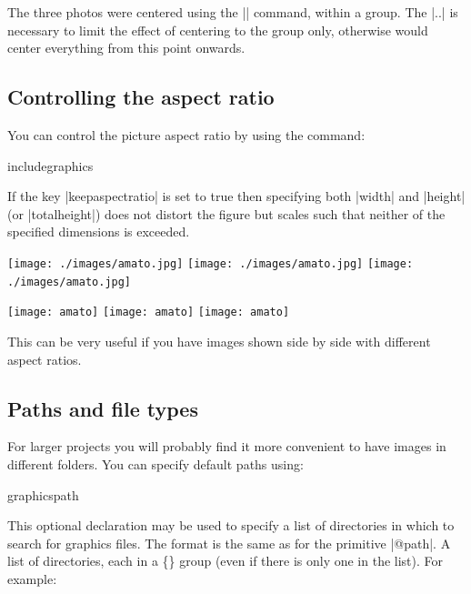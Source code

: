 The three photos were centered using the |\centering| command, within a group. The |\begingroup..\endgroup| is necessary to limit the effect of centering to
the group only, otherwise \tex would center everything from this point onwards.

\subsection{Controlling the aspect ratio}

You can control the picture aspect ratio by using the command:

\begin{docCommand}{includegraphics}{ }
\end{docCommand}

If the key |keepaspectratio| is set to true then specifying 
both |width| and |height| (or |totalheight|) does not distort the ﬁgure but 
scales such that neither of the speciﬁed dimensions is exceeded.

\medskip

\begingroup

\centering
\texttt{[image: ./images/amato.jpg]}
\texttt{[image: ./images/amato.jpg]}
\texttt{[image: ./images/amato.jpg]}

\endgroup

\begin{teX}
\begingroup

\centering
\texttt{[image: amato]}
\texttt{[image: amato]}
\texttt{[image: amato]}

\endgroup

\end{teX}

This can be very useful if you have images shown side by side with different
aspect ratios. 


\subsection{Paths and file types}

For larger projects you will probably find it more convenient to have 
images in different folders. You can specify default paths using:


\begin{docCommand}{graphicspath} {} {}
\end{docCommand}

This optional declaration may be used to specify a list of directories in which to
search for graphics ﬁles. The format is the same as for the \latexe primitive
|@path|. A list of directories, each in a \{\} group (even if there is only one
in the list). For example:

